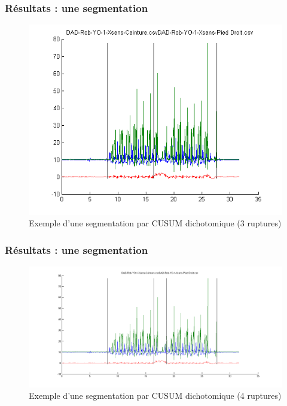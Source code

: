 \documentclass{beamer}
\begin{document}
\begin{frame}
	\frametitle{Résultats : une segmentation}
	\begin{figure}
		\includegraphics[scale=0.5]{dikt-seg3.png}
		\caption{Exemple d'une segmentation par CUSUM dichotomique (3 ruptures)}
	\end{figure}
\end{frame}

\begin{frame}
	\frametitle{Résultats : une segmentation}
	\begin{figure}
		\includegraphics[scale=0.3]{dikt-seg4.png}
		\caption{Exemple d'une segmentation par CUSUM dichotomique (4 ruptures)}
	\end{figure}
\end{frame}
\end{document}
